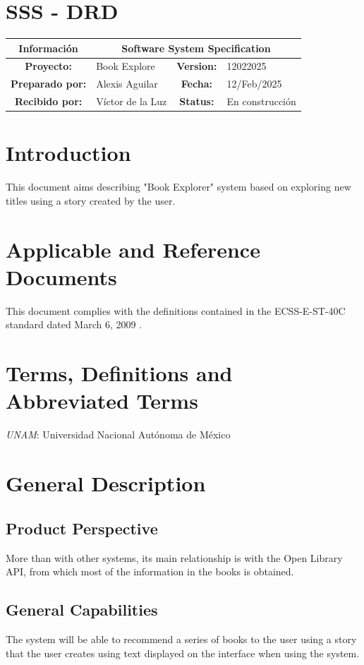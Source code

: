 \documentclass[12pt,a4paper]{article}
\begin{document}
\section*{SSS - DRD}
\begin{center} 
    \begin{tabular}{|c|l|c|l|}
        \hline
        \textbf{Información} & \multicolumn{3}{|c|}{Software System Specification} \\
        \hline
        \textbf{Proyecto:} & Book Explore & \textbf{Version:} & 12022025 \\    
        \hline
        \textbf{Preparado por:} & Alexis Aguilar & \textbf{Fecha:} & 12/Feb/2025 \\    
        \hline
        \textbf{Recibido por:} & Víctor de la Luz & \textbf{Status:} & En construcción \\    
        \hline
    \end{tabular}
\end{center}

\section{Introduction}
This document aims describing "Book Explorer" system based on exploring new 
titles using a story created by the user.

\section{Applicable and Reference Documents}
This document complies with the definitions contained in the 
ECSS-E-ST-40C standard dated March 6, 2009 \cite{ECSS-E-ST-40C}.

\section{Terms, Definitions and Abbreviated Terms}
\emph{UNAM}: Universidad Nacional Autónoma de México

\section{General Description}
\subsection{Product Perspective}
More than with other systems, its main relationship is with the 
Open Library API, from which most of the information in the books is obtained.
\subsection{General Capabilities}
The system will be able to recommend a series of books to the user using a 
story that the user creates using text displayed on the interface when using 
the system.
\end{document}
